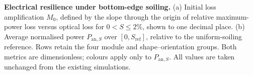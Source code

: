 \caption{\textbf{Electrical resilience under bottom-edge soiling.} (a) Initial loss amplification $M_0$, defined by the slope through the origin of relative maximum-power loss versus optical loss for $0<S\leq2\%$, shown to one decimal place. (b) Average normalised power $P_{\mathrm{an},S}$ over $[0,S_{\mathrm{ref}}]$, relative to the uniform-soiling reference. Rows retain the four module and shape--orientation groups. Both metrics are dimensionless; colours apply only to $P_{\mathrm{an},S}$. All values are taken unchanged from the existing simulations.\label{fig:resilience}}
